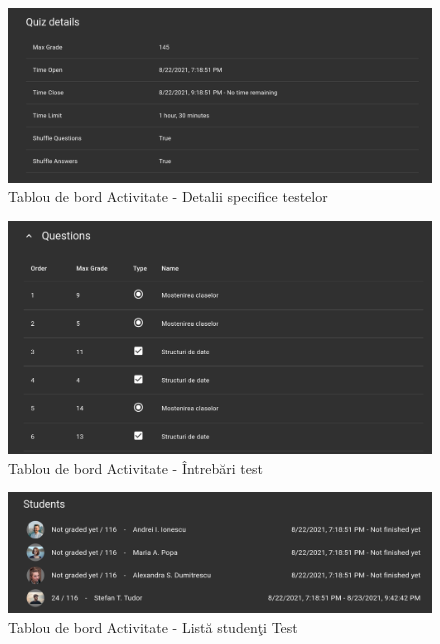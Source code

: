 \documentclass[12pt, a4paper, oneside, romanian]{teza-upb}
\begin{document}
\begin{figure}[H]
\centering
\includegraphics*[width=\columnwidth]{tablou-de-bord-activitate-detalii-specifice-testelor}
\caption{Tablou de bord Activitate - Detalii specifice testelor}
\label{tablou-de-bord-activitate-detalii-specifice-testelor}
\end{figure}

\begin{figure}[H]
\centering
\includegraphics*[width=\columnwidth]{tablou-de-bord-activitate-intrebari-test}
\caption{Tablou de bord Activitate - Întrebări test}
\label{tablou-de-bord-activitate-intrebari-test}
\end{figure}

\begin{figure}[H]
\centering
\includegraphics*[width=\columnwidth]{tablou-de-bord-activitate-lista-studenti-test}
\caption{Tablou de bord Activitate - Listă studenţi Test}
\label{tablou-de-bord-activitate-lista-studenti-test}
\end{figure}
\end{document}

